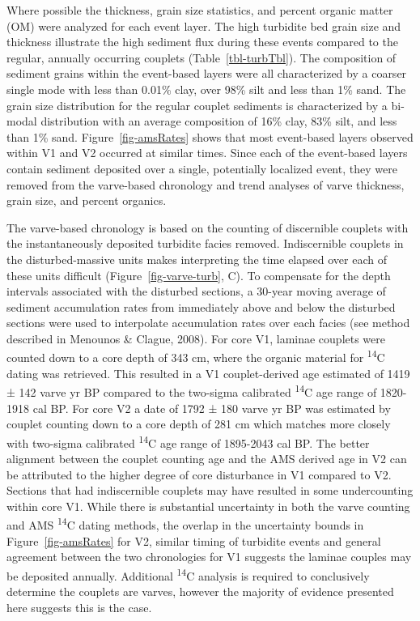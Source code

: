 \documentclass[
  letterpaper,
  DIV=11,
  numbers=noendperiod]{scrartcl}
\begin{document}
Where possible the thickness, grain size statistics, and percent organic
matter (OM) were analyzed for each event layer. The high turbidite bed
grain size and thickness illustrate the high sediment flux during these
events compared to the regular, annually occurring couplets
(Table~\ref{tbl-turbTbl}). The composition of sediment grains within the
event-based layers were all characterized by a coarser single mode with
less than 0.01\% clay, over 98\% silt and less than 1\% sand. The grain
size distribution for the regular couplet sediments is characterized by
a bi-modal distribution with an average composition of 16\% clay, 83\%
silt, and less than 1\% sand. Figure~\ref{fig-amsRates} shows that most
event-based layers observed within V1 and V2 occurred at similar times.
Since each of the event-based layers contain sediment deposited over a
single, potentially localized event, they were removed from the
varve-based chronology and trend analyses of varve thickness, grain
size, and percent organics.

The varve-based chronology is based on the counting of discernible
couplets with the instantaneously deposited turbidite facies removed.
Indiscernible couplets in the disturbed-massive units makes interpreting
the time elapsed over each of these units difficult
(Figure~\ref{fig-varve-turb}, C). To compensate for the depth intervals
associated with the disturbed sections, a 30-year moving average of
sediment accumulation rates from immediately above and below the
disturbed sections were used to interpolate accumulation rates over each
facies (see method described in Menounos \& Clague, 2008). For core V1,
laminae couplets were counted down to a core depth of 343 cm, where the
organic material for \textsuperscript{14}C dating was retrieved. This
resulted in a V1 couplet-derived age estimated of 1419 ± 142 varve yr BP
compared to the two-sigma calibrated \textsuperscript{14}C age range of
1820-1918 cal BP. For core V2 a date of 1792 ± 180 varve yr BP was
estimated by couplet counting down to a core depth of 281 cm which
matches more closely with two-sigma calibrated \textsuperscript{14}C age
range of 1895-2043 cal BP. The better alignment between the couplet
counting age and the AMS derived age in V2 can be attributed to the
higher degree of core disturbance in V1 compared to V2. Sections that
had indiscernible couplets may have resulted in some undercounting
within core V1. While there is substantial uncertainty in both the varve
counting and AMS \textsuperscript{14}C dating methods, the overlap in
the uncertainty bounds in Figure~\ref{fig-amsRates} for V2, similar
timing of turbidite events and general agreement between the two
chronologies for V1 suggests the laminae couples may be deposited
annually. Additional \textsuperscript{14}C analysis is required to
conclusively determine the couplets are varves, however the majority of
evidence presented here suggests this is the case.
\end{document}
